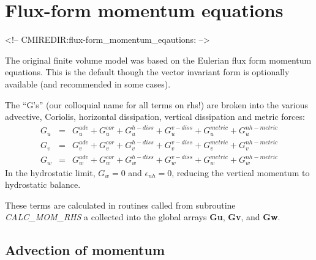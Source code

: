 
\section{Flux-form momentum equations}
\label{sect:flux-form_momentum_equations}
\begin{rawhtml}
<!-- CMIREDIR:flux-form_momentum_eqautions: -->
\end{rawhtml}

The original finite volume model was based on the Eulerian flux form
momentum equations. This is the default though the vector invariant
form is optionally available (and recommended in some cases).

The ``G's'' (our colloquial name for all terms on rhs!) are broken
into the various advective, Coriolis, horizontal dissipation, vertical
dissipation and metric forces:
\begin{eqnarray}
G_u & = & G_u^{adv} + G_u^{cor} + G_u^{h-diss} + G_u^{v-diss} +
G_u^{metric} + G_u^{nh-metric} \label{eq:gsplit_momu} \\
G_v & = & G_v^{adv} + G_v^{cor} + G_v^{h-diss} + G_v^{v-diss} +
G_v^{metric} + G_v^{nh-metric} \label{eq:gsplit_momv} \\
G_w & = & G_w^{adv} + G_w^{cor} + G_w^{h-diss} + G_w^{v-diss} +
G_w^{metric} + G_w^{nh-metric} \label{eq:gsplit_momw}
\end{eqnarray}
In the hydrostatic limit, $G_w=0$ and $\epsilon_{nh}=0$, reducing the
vertical momentum to hydrostatic balance.

These terms are calculated in routines called from subroutine {\em
CALC\_MOM\_RHS} a collected into the global arrays {\bf Gu}, {\bf Gv},
and {\bf Gw}.



\subsection{Advection of momentum}

